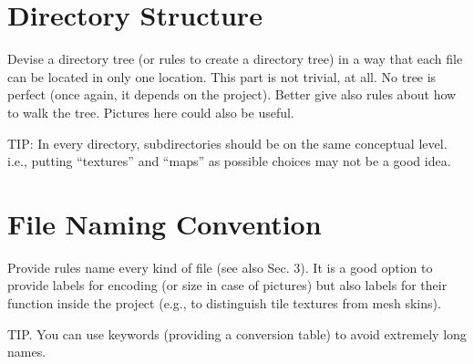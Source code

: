 \documentclass[12pt]{article}
\begin{document}
\section{Directory Structure}
Devise a directory tree (or rules to create a directory tree) in a way that each file can be located in only one location.
This part is not trivial, at all.
No tree is perfect (once again, it depends on the project). Better give also rules about how to walk the tree.
Pictures here could also be useful.

TIP: In every directory, subdirectories should be on the same conceptual level. i.e., putting “textures” and “maps” as possible choices may not be a good idea.
\section{File Naming Convention}
Provide rules name every kind of file (see also Sec. 3).
It is a good option to provide labels for encoding (or size in case of pictures) but also labels for their function inside the project (e.g., to distinguish tile textures from mesh skins).

TIP. You can use keywords (providing a conversion table) to avoid extremely long names.
\end{document}
